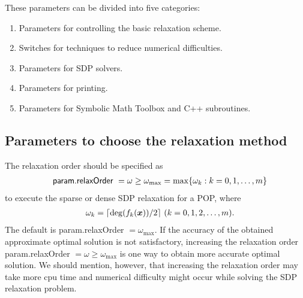 These parameters can be divided into five categories:
\begin{enumerate}
\item  Parameters for controlling the basic relaxation scheme.
\item  Switches for techniques to reduce numerical difficulties.
\item  Parameters for  SDP solvers.
\item  Parameters for printing.
\item  Parameters for Symbolic Math Toolbox and C++ subroutines.
\end{enumerate}

\subsection{Parameters to choose the relaxation method}

The relaxation order should be specified as 
\begin{eqnarray*}
& & \mbox{{\sf param.relaxOrder} }  =\omega \geq \omega_{\max} = \max \{ \omega_k : k =0,1,\ldots,m \}
\end{eqnarray*}
to execute the sparse or dense SDP relaxation for a POP,
where 
\begin{eqnarray*}
& & \omega_k = \lceil \deg(f_k(\x)) / 2 \rceil \ (k=0,1,2,\ldots,m). 
\end{eqnarray*}
The default is {\sf param.relaxOrder} $= \omega_{\max}$. If the accuracy of the obtained approximate optimal solution
is not satisfactory,  increasing the relaxation order {\sf param.relaxOrder} $=\omega \geq \omega_{\max}$ is
one way to obtain more accurate optimal solution.
We should mention, however, that increasing the relaxation order may take more cpu time and
numerical difficulty might occur while solving the SDP relaxation problem.

